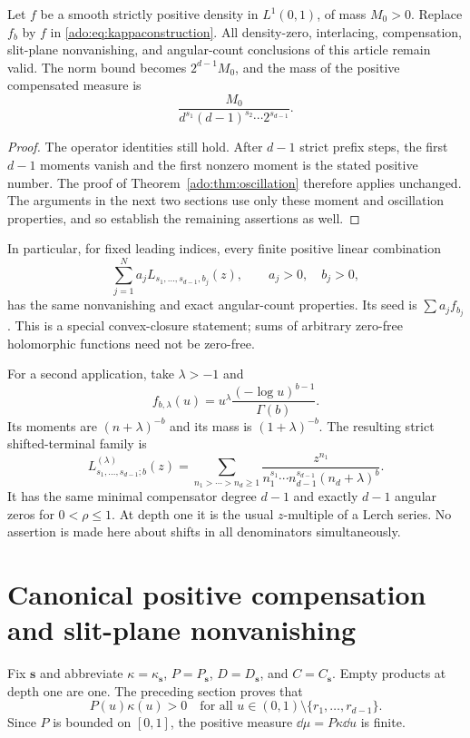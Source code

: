 \begin{theorem}
\label{ado:thm:seedextension}
Let $f$ be a smooth strictly positive density in $L^1(0,1)$, of mass
$M_0>0$. Replace $f_b$ by $f$ in \eqref{ado:eq:kappaconstruction}.
All density-zero, interlacing, compensation, slit-plane nonvanishing,
and angular-count conclusions of this article remain valid. The norm
bound becomes $2^{d-1}M_0$, and the mass of the positive compensated
measure is
\[
 \frac{M_0}{d^{s_1}(d-1)^{s_2}\cdots2^{s_{d-1}}}.
\]
\end{theorem}
\begin{proof}
The operator identities still hold. After $d-1$ strict prefix steps,
the first $d-1$ moments vanish and the first nonzero moment is the
stated positive number. The proof of Theorem~\ref{ado:thm:oscillation}
therefore applies unchanged. The arguments in the next two sections
use only these moment and oscillation properties, and so establish the
remaining assertions as well.
\end{proof}
In particular, for fixed leading indices, every finite positive linear
combination
\begin{equation}\label{ado:eq:terminalmixture}
 \sum_{j=1}^N a_j L_{s_1,\ldots,s_{d-1},b_j}(z),
 \qquad a_j>0,\quad b_j>0,
\end{equation}
has the same nonvanishing and exact angular-count properties. Its seed
is $\sum a_jf_{b_j}$. This is a special convex-closure statement; sums
of arbitrary zero-free holomorphic functions need not be zero-free.

For a second application, take $\lambda>-1$ and
\[
 f_{b,\lambda}(u)=u^\lambda
                \frac{(-\log u)^{b-1}}{\Gamma(b)}.
\]
Its moments are $(n+\lambda)^{-b}$ and its mass is
$(1+\lambda)^{-b}$. The resulting strict shifted-terminal family is
\begin{equation}\label{ado:eq:lerchfamily}
 L^{(\lambda)}_{s_1,\ldots,s_{d-1};b}(z)
 =\sum_{n_1>\cdots>n_d\ge1}
 \frac{z^{n_1}}{n_1^{s_1}\cdots n_{d-1}^{s_{d-1}}(n_d+\lambda)^b}.
\end{equation}
It has the same minimal compensator degree $d-1$ and exactly $d-1$
angular zeros for $0<\rho\le1$. At depth one it is the usual
$z$-multiple of a Lerch series. No assertion is made here about shifts
in all denominators simultaneously.

\section{Canonical positive compensation and slit-plane nonvanishing}
\label{ado:sec:compensation}
Fix $\boldsymbol{s}$ and abbreviate $\kappa=\kappa_{\boldsymbol{s}}$,
$P=P_{\boldsymbol{s}}$, $D=D_{\boldsymbol{s}}$, and $C=C_{\boldsymbol{s}}$. Empty products
at depth one are one. The preceding section proves that
\begin{equation}\label{ado:eq:positiveweight}
 P(u)\kappa(u)>0
 \quad\text{for all }u\in(0,1)\setminus\{r_1,\ldots,r_{d-1}\}.
\end{equation}
Since $P$ is bounded on $[0,1]$, the positive measure
$\dd\mu=P\kappa\dd u$ is finite.

